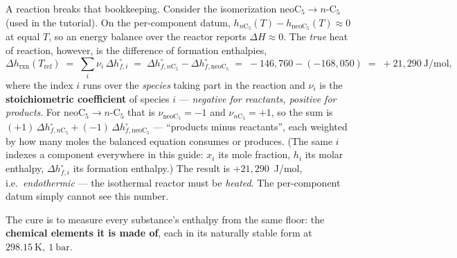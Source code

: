 \documentclass[11pt,a4paper]{article}
\begin{document}
A reaction breaks that bookkeeping.  Consider the isomerization
$\mathrm{neoC_5} \to n\text{-}\mathrm{C_5}$ (used in the
 tutorial).  On the per-component
datum, $h_{n\mathrm{C_5}}(T) - h_{\mathrm{neoC_5}}(T) \approx 0$ at equal
$T$, so an energy balance over the reactor reports $\Delta H \approx 0$.
The \emph{true} heat of reaction, however, is the difference of formation
enthalpies,
\begin{equation}
   \Delta h_{\mathrm{rxn}}(T_{\mathrm{ref}}) \;=\;
   \sum_i \nu_i\, \Delta h^{\circ}_{f,i}
   \;=\; \Delta h^{\circ}_{f,n\mathrm{C_5}} - \Delta h^{\circ}_{f,\mathrm{neoC_5}}
   \;=\; -146{,}760 - (-168{,}050)
   \;=\; +21{,}290~\mathrm{J/mol},
\end{equation}
where the index $i$ runs over the \emph{species} taking part in the
reaction and $\nu_i$ is the \textbf{stoichiometric coefficient} of
species $i$ --- \emph{negative for reactants, positive for products}.
For $\mathrm{neoC_5} \to n\text{-}\mathrm{C_5}$ that is
$\nu_{\mathrm{neoC_5}} = -1$ and $\nu_{n\mathrm{C_5}} = +1$, so the sum
is $(+1)\,\Delta h^{\circ}_{f,n\mathrm{C_5}}
  + (-1)\,\Delta h^{\circ}_{f,\mathrm{neoC_5}}$ ---
``products minus reactants'', each weighted by how many moles the
balanced equation consumes or produces.  (The same $i$ indexes a
component everywhere in this guide: $x_i$ its mole fraction, $h_i$ its
molar enthalpy, $\Delta h^{\circ}_{f,i}$ its formation enthalpy.)  The
result is $+21{,}290$~J/mol, i.e.\ \emph{endothermic} --- the isothermal
reactor must be \emph{heated}.  The per-component datum simply cannot
see this number.

The cure is to measure every substance's enthalpy from the same floor:
the \textbf{chemical elements it is made of}, each in its naturally
stable form at $298.15~\mathrm{K},\ 1~\mathrm{bar}$.
\end{document}
